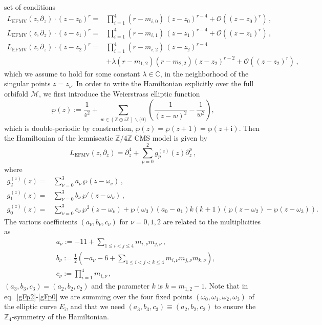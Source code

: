 \documentclass{article}
\def \om {\omega}
\def \ds {\partial}
\def \la {\lambda}
\def \Zs {\mathbb{Z}}
\def \Cs {\mathbb{C}}
\begin{document}
set of conditions 
\begin{align}
L_{\mathrm{EFMV}}(z,\ds_z) \cdot (z-z_{0})^r =&  \prod_{i=1}^{4} (r-m_{i,0}) \, (z-z_{0})^{r-4} + \mathcal{O}( (z-z_{0})^{r})\,, \label{L_near_z0}\\
L_{\mathrm{EFMV}}(z,\ds_z) \cdot (z-z_{1})^r =&  \prod_{i=1}^{4} (r-m_{i,1}) \, (z-z_{1})^{r-4} + \mathcal{O}( (z-z_{1})^{r})\,, \label{L_near_z1} \\
L_{\mathrm{EFMV}}(z,\ds_z) \cdot (z-z_{2})^r =&  \prod_{i=1}^{4} (r-m_{i,2}) \, (z-z_{2})^{r-4}  \label{L_near_z2} \\
&+ \lambda (r-m_{1,2})(r-m_{2,2}) (z-z_2)^{r-2} +\mathcal{O}( (z-z_{2})^{r})\,, \nonumber
\end{align}
which we assume to hold for some constant $\la \in \Cs$, in the neighborhood of the singular 
points $z = z_{\nu}$. In order to write the Hamiltonian explicitly over the full orbifold $\mathcal{M}$, we first introduce the Weierstrass elliptic function 
\begin{equation}
\wp(z) := \frac{1}{z^2} + \sum_{w \in (\Zs\oplus i\Zs)\backslash \{0\}} \left( \frac{1}{(z-w)^2}-\frac{1}{w^2} \right),
\label{wp}
\end{equation}
which is double-periodic by construction, $\wp(z)=\wp(z+1)=\wp(z+\mathrm{i})$. Then the Hamiltonian of the 
lemniscatic $\Zs/4 \Zs$ CMS model is given by \cite[Eq.~4.3]{etingof2011107} 
\begin{equation}
   L_{\mathrm{EFMV}}(z,\ds_z) = \ds_z^4 + \sum_{p=0}^2 g^{(z)}_p (z) \ds_z^p\,,
   \label{LEFMV}
\end{equation}
where 
\begin{align}
g_2^{(z)} (z)  =&  \sum_{\nu=0}^3 a_{\nu} \, \wp(z-\om_{\nu})\,, \label{gFp2}  \\
g_1^{(z)} (z) =& \sum_{\nu=0}^3 b_{\nu} \, \wp'(z-\om_{\nu})\,,\label{gFp1}  \\
g_0^{(z)} (z) =& \sum_{\nu=0}^3 c_{\nu} \, \wp^2(z-\om_{\nu}) + \wp(\om_3)(a_0-a_1) k(k+1)  \left( \wp(z-\om_2)- \wp (z-\om_3) \right).  \label{gFp0}
\end{align}
The various coefficients $(a_{\nu},b_{\nu},c_{\nu})$ for $\nu=0,1,2$ are related to 
the multiplicities as \cite[Example~7.7]{etingof2011107}
\begin{align}
    & a_{\nu} :=-11+ \sum_{1\leq i < j \leq 4} m_{i,\nu} m_{j,\nu}\,, \label{level2} \\
&b_{\nu} := \frac{1}{2} \left(- a_{\nu} - 6 + \sum_{1\leq i < j < k \leq 4} m_{i,\nu} m_{j,\nu} m_{k,\nu}  \right),\label{level3} \\
& c_{\nu} := \prod_{i=1}^4 m_{i,\nu}\,,   \label{level4}
\end{align}
$(a_3,b_3,c_3) = (a_2,b_2,c_2)$ and the parameter $k$ is $k = m_{1,2}-1$. Note that in 
eq.\ \eqref{gFp2}-\eqref{gFp0} we are summing over the four fixed points $(\om_0,\om_1,\om_2,\om_3)$ of the elliptic curve $E_\mathrm{i}$, and that we need $(a_3,b_3,c_3) \equiv (a_2,b_2,c_2)$ to ensure the $\Zs_4$-symmetry of the Hamiltonian. 
\end{document}
